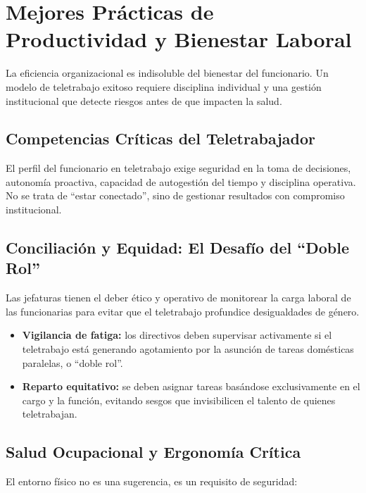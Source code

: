 \documentclass[11pt,letterpaper]{article}
\newcommand{\strong}[1]{\textbf{\textcolor{AzulProfundo}{#1}}}
\begin{document}
\section{Mejores Prácticas de Productividad y Bienestar Laboral}

La eficiencia organizacional es indisoluble del bienestar del funcionario. Un modelo de teletrabajo exitoso requiere disciplina individual y una gestión institucional que detecte riesgos antes de que impacten la salud.

\subsection{Competencias Críticas del Teletrabajador}

El perfil del funcionario en teletrabajo exige seguridad en la toma de decisiones, autonomía proactiva, capacidad de autogestión del tiempo y disciplina operativa. No se trata de ``estar conectado'', sino de gestionar resultados con compromiso institucional.

\subsection{Conciliación y Equidad: El Desafío del ``Doble Rol''}

Las jefaturas tienen el deber ético y operativo de monitorear la carga laboral de las funcionarias para evitar que el teletrabajo profundice desigualdades de género.

\begin{itemize}
    \item \strong{Vigilancia de fatiga:} los directivos deben supervisar activamente si el teletrabajo está generando agotamiento por la asunción de tareas domésticas paralelas, o ``doble rol''.
    \item \strong{Reparto equitativo:} se deben asignar tareas basándose exclusivamente en el cargo y la función, evitando sesgos que invisibilicen el talento de quienes teletrabajan.
\end{itemize}

\subsection{Salud Ocupacional y Ergonomía Crítica}

El entorno físico no es una sugerencia, es un requisito de seguridad:
\end{document}

